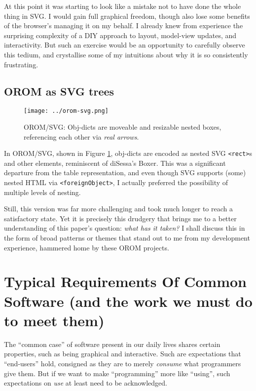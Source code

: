 At this point it was starting to look like a mistake not to have done
the whole thing in SVG. I would gain full graphical freedom, though also
lose some benefits of the browser's managing it on my behalf. I already
knew from experience the surprising complexity of a DIY approach to
layout, model-view updates, and interactivity. But such an exercise
would be an opportunity to carefully observe this tedium, and
crystallise some of my intuitions about why it is so consistently
frustrating.

\hypertarget{orom-as-svg-trees}{%
\subsection{OROM as SVG trees}\label{orom-as-svg-trees}}

\begin{figure}[h]
  \centering
  \texttt{[image: ../orom-svg.png]}
  \caption{OROM/SVG: Obj-dicts are moveable and resizable nested boxes,
           referencing each other via \emph{real arrows}.\label{fig:orom-svg}}
\end{figure}

In OROM/SVG, shown in Figure \ref{fig:orom-svg}, obj-dicts are encoded
as nested SVG \texttt{\textless{}rect\textgreater{}}s and other
elements, reminiscent of diSessa's Boxer\cite{boxer}. This was a
significant departure from the table representation, and even though SVG
supports (some) nested HTML via
\texttt{\textless{}foreignObject\textgreater{}}, I actually preferred
the possibility of multiple levels of nesting.

Still, this version was far more challenging and took much longer to
reach a satisfactory state. Yet it is precisely this drudgery that
brings me to a better understanding of this paper's question: \emph{what
has it taken?} I shall discuss this in the form of broad patterns or
themes that stand out to me from my development experience, hammered
home by these OROM projects.

\hypertarget{typical-requirements-of-common-software-and-the-work-we-must-do-to-meet-them}{%
\section{Typical Requirements Of Common Software (and the work we must
do to meet
them)}\label{typical-requirements-of-common-software-and-the-work-we-must-do-to-meet-them}}

The ``common case'' of software present in our daily lives shares
certain properties, such as being graphical and interactive. Such are
expectations that ``end-users'' hold, consigned as they are to merely
\emph{consume} what programmers give them. But if we want to make
``programming'' more like ``using'', such expectations on \emph{use} at
least need to be acknowledged.

